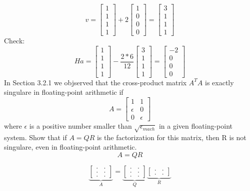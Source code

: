 \documentclass{jhwhw}
\begin{document}
\[
v = 
\begin{bmatrix}
  1 \\
  1 \\
  1 \\
  1
\end{bmatrix}
+
2
\begin{bmatrix}
  1 \\
  0 \\
  0 \\
  0
\end{bmatrix}
=
\begin{bmatrix}
  3 \\
  1 \\
  1 \\
  1
\end{bmatrix}
\]
Check:
\[
Ha = 
\begin{bmatrix}
  1 \\
  1 \\
  1 \\
  1
\end{bmatrix}
-
\frac{2*6}{12}
\begin{bmatrix}
  3 \\
  1 \\
  1 \\
  1
\end{bmatrix}
=
\begin{bmatrix}
 -2 \\
  0 \\
  0 \\
  0
\end{bmatrix}
\]
In Section 3.2.1 we objserved that the cross-product matrix $A^TA$ is exactly
singulare in floating-point arithmetic if
\[
A = 
\begin{bmatrix}
  1 & 1 \\
  \epsilon & 0 \\
  0 & \epsilon
\end{bmatrix}
\]
where $\epsilon$ is a positive number smaller than $\sqrt{\epsilon_{mach}}$
in a given floating-point system. Show that if $A=QR$ is the factorization 
for this matrix, then R is not singulare, even in floating-point arithmetic.
\solution
\[
A = QR
\]

\[
\underbrace{\begin{bmatrix}
  . & . \\
  . & . \\
  . & .
\end{bmatrix}}_A
=
\underbrace{\begin{bmatrix}
  . & . \\
  . & . \\
  . & .
\end{bmatrix}}_Q
\underbrace{\begin{bmatrix}
  . & . \\
  . & .
\end{bmatrix}}_R
\]
\end{document}
